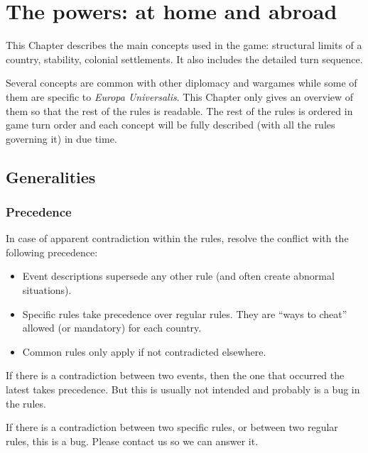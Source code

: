 
\chapter{The powers: at home and abroad}\label{chapter:ThePowers}

\begin{designnote}
  This Chapter describes the main concepts used in the game: structural limits
  of a country, stability, colonial settlements. It also includes the detailed
  turn sequence.

  Several concepts are common with other diplomacy and wargames while some of
  them are specific to \emph{Europa Universalis}. This Chapter only gives an
  overview of them so that the rest of the rules is readable. The rest of the
  rules is ordered in game turn order and each concept will be fully described
  (with all the rules governing it) in due time.
\end{designnote}




\section{Generalities}



\subsection{Precedence}

\aparag In case of apparent contradiction within the rules, resolve the
conflict with the following precedence:
\begin{itemize}
\item Event descriptions supersede any other rule (and often create abnormal
  situations).
\item Specific rules take precedence over regular rules. They are ``ways to
  cheat'' allowed (or mandatory) for each country.
\item Common rules only apply if not contradicted elsewhere.
\end{itemize}

\aparag If there is a contradiction between two events, then the one that
occurred the latest takes precedence. But this is usually not intended and
probably is a bug in the rules.

\aparag If there is a contradiction between two specific rules, or between two
regular rules, this is a bug. Please contact us so we can answer it.



